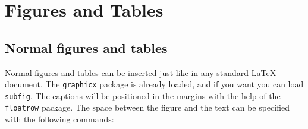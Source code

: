 \setchapterpreamble[u]{\margintoc[*-4.5]}

\makeatletter
\renewcommand{\chapterlinesformat}[3]{%
  \@hangfrom{#2}{#3}%
}
\makeatother
\renewcommand*{\chapterformat}{%
  \mbox{\chapappifchapterprefix{\nobreakspace}\thechapter
	\autodot\IfUsePrefixLine{}{\enskip}}}

\chapter{Figures and Tables}

\section{Normal figures and tables}

Normal figures and tables can be inserted just like in any standard 
\LaTeX\xspace document. The \verb|graphicx| package is already loaded, 
and if you want you can load \verb|subfig|. The captions will be 
positioned in the margins with the help of the \verb|floatrow| package. 
The space between the figure and the text can be specified with the 
following commands:

